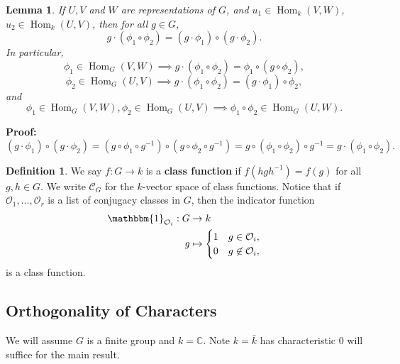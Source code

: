 \documentclass[12pt]{article}
\DeclareMathOperator{\Hom}{Hom}
\newtheorem{lemma}{Lemma}[section]
\theoremstyle{definition}
\newtheorem{definition}{Definition}[section]
\theoremstyle{remark}
\begin{document}
\begin{lemma}
	If $U, V$ and $W$ are representations of $G$, and $u_1 \in \Hom_k(V, W)$, $u_2 \in \Hom_k(U, V)$, then for all $g \in G$,
	\[
		g \cdot (\phi_1 \circ \phi_2) = (g \cdot \phi_1) \circ (g \cdot \phi_2)
	.\]
	In particular,
\[\phi_1 \in \Hom_G(V, W) \implies g\cdot(\phi_1 \circ \phi_2) = \phi_1 \circ(g \circ \phi_2),\]
\[
	\phi_2 \in \Hom_G(U, V) \implies g \cdot(\phi_1 \circ \phi_2) = (g \cdot \phi_1) \circ \phi_2
,\]
and
\[
	\phi_1 \in \Hom_G(V, W), \phi_2 \in \Hom_G(U, V) \implies \phi_1 \circ \phi_2 \in \Hom_G(U, W)
.\]
\end{lemma}

\begin{adjustbox}{minipage = \columnwidth - 25.5pt, margin=1em, frame=1pt, margin=0em}
\textbf{Proof:} 
\[
	(g \cdot \phi_1) \circ (g \cdot \phi_2) = (g \circ \phi_1 \circ g^{-1}) \circ (g \circ \phi_2 \circ g^{-1}) = g \circ (\phi_1 \circ \phi_2) \circ g^{-1} = g \cdot (\phi_1 \circ \phi_2)
.\]
\end{adjustbox}

\begin{definition}
	We say $f : G \to k$ is a \textbf{class function} if $f(hgh^{-1}) = f(g)$ for all $g, h \in G$. We write $ \mathcal{C}_G$ for the $k$-vector space of class functions. Notice that if $\mathcal{O}_1, \ldots, \mathcal{O}_r$ is a list of conjugacy classes in $G$, then the indicator function
	\begin{align*}
		\mathbbm{1}_{\mathcal{O}_i} : G &\to k \\
		g &\mapsto
		\begin{cases}
			1 & g \in \mathcal{O}_i, \\
			0 & g \not \in \mathcal{O}_i,
		\end{cases}
	\end{align*}
	is a class function.
\end{definition}

\subsection{Orthogonality of Characters}%
\label{sub:orthogonality_of_characters}

We will assume $G$ is a finite group and $k = \mathbb{C}$. Note $k = \bar k$ has characteristic $0$ will suffice for the main result.
\end{document}
